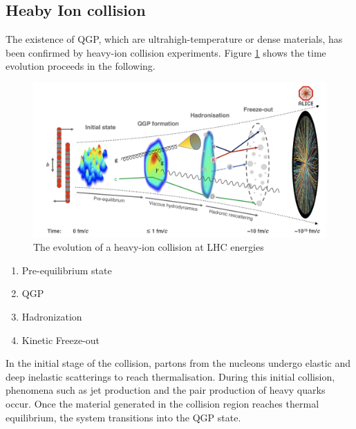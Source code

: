    \subsection{Heaby Ion collision}
        The existence of QGP, which are ultrahigh-temperature or dense materials, has been confirmed by heavy-ion collision experiments. Figure  \ref{Intro:HIC:space_time_evaluation_of_HIC} shows the time evolution proceeds in the following.
        \begin{figure}[hbtp]
            \centering
            \includegraphics[keepaspectratio, scale=0.4]{fig/1_5_QGP_Evol.png}
            \caption{The evolution of a heavy-ion collision at LHC energies\cite{QGP_evo}}
            \label{Intro:HIC:space_time_evaluation_of_HIC}
        \end{figure}
        \begin{enumerate}
            \item Pre-equilibrium state
            \item QGP
            \item Hadronization
            \item Kinetic Freeze-out
        \end{enumerate}
        In the initial stage of the collision, partons from the nucleons undergo elastic and deep inelastic scatterings to reach thermalisation. During this initial collision, phenomena such as jet production and the pair production of heavy quarks occur. Once the material generated in the collision region reaches thermal equilibrium, the system transitions into the QGP state.  
        

